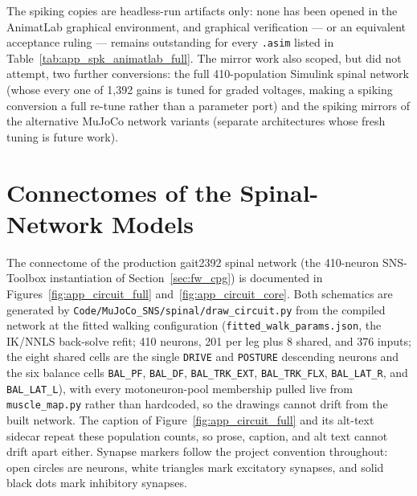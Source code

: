 The spiking copies are headless-run artifacts only: none has been opened in the AnimatLab graphical environment, and graphical verification --- or an equivalent acceptance ruling --- remains outstanding for every \texttt{.asim} listed in Table~\ref{tab:app_spk_animatlab_full}. The mirror work also scoped, but did not attempt, two further conversions: the full 410-population Simulink spinal network (whose every one of 1,392 gains is tuned for graded voltages, making a spiking conversion a full re-tune rather than a parameter port) and the spiking mirrors of the alternative MuJoCo network variants (separate architectures whose fresh tuning is future work).

\section{Connectomes of the Spinal-Network Models}\label{app:connectomes}

The connectome of the production gait2392 spinal network (the 410-neuron SNS-Toolbox instantiation of Section~\ref{sec:fw_cpg}) is documented in Figures~\ref{fig:app_circuit_full} and~\ref{fig:app_circuit_core}. Both schematics are generated by \texttt{Code/MuJoCo\_SNS/spinal/draw\_circuit.py} from the compiled network at the fitted walking configuration (\texttt{fitted\_walk\_params.json}, the IK/NNLS back-solve refit; 410 neurons, 201 per leg plus 8 shared, and 376 inputs; the eight shared cells are the single \texttt{DRIVE} and \texttt{POSTURE} descending neurons and the six balance cells \texttt{BAL\_PF}, \texttt{BAL\_DF}, \texttt{BAL\_TRK\_EXT}, \texttt{BAL\_TRK\_FLX}, \texttt{BAL\_LAT\_R}, and \texttt{BAL\_LAT\_L}), with every motoneuron-pool membership pulled live from \texttt{muscle\_map.py} rather than hardcoded, so the drawings cannot drift from the built network. The caption of Figure~\ref{fig:app_circuit_full} and its alt-text sidecar repeat these population counts, so prose, caption, and alt text cannot drift apart either. Synapse markers follow the project convention throughout: open circles are neurons, white triangles mark excitatory synapses, and solid black dots mark inhibitory synapses.


